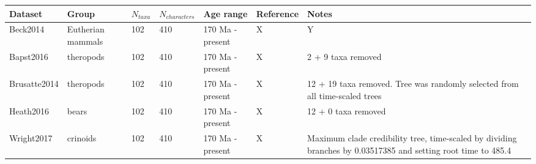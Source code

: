 
\begin{tabular}[t]{l p{3cm} l l l l p{6cm}}		

\hline
\textbf{Dataset} & \textbf{Group} & \textbf{$N_{taxa}$} & \textbf{$N_{characters}$} & \textbf{Age range} & \textbf{Reference} & \textbf{Notes} \\
\hline
Beck2014 & Eutherian mammals & 102 & 410 & 170 Ma - present & X & Y \\
Bapst2016 & theropods & 102 & 410 & 170 Ma - present & X & 2 + 9 taxa removed\\
Brusatte2014 & theropods & 102 & 410 & 170 Ma - present & X & 12 + 19 taxa removed. Tree was randomly selected from all time-scaled trees\\
Heath2016 & bears & 102 & 410 & 170 Ma - present & X & 12 + 0 taxa removed\\
Wright2017 & crinoids & 102 & 410 & 170 Ma - present & X & Maximum clade credibility tree, time-scaled by dividing branches by 0.03517385 and setting root time to 485.4\\
\hline
\end{tabular}